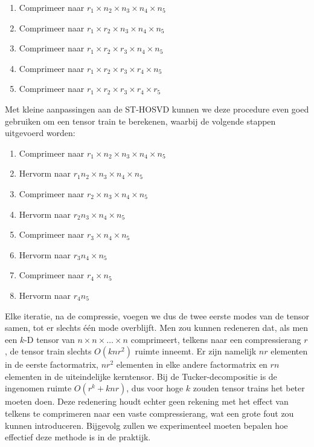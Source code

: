\begin{enumerate}
\item Comprimeer naar $r_1 \times n_2 \times n_3 \times n_4 \times n_5$
\item Comprimeer naar $r_1 \times r_2 \times n_3 \times n_4 \times n_5$
\item Comprimeer naar $r_1 \times r_2 \times r_3 \times n_4 \times n_5$
\item Comprimeer naar $r_1 \times r_2 \times r_3 \times r_4 \times n_5$
\item Comprimeer naar $r_1 \times r_2 \times r_3 \times r_4 \times r_5$
\end{enumerate}

Met kleine aanpassingen aan de ST-HOSVD kunnen we deze procedure even goed gebruiken om een tensor train te berekenen, waarbij de volgende stappen uitgevoerd worden:

\begin{enumerate}
\item Comprimeer naar $r_1 \times n_2 \times n_3 \times n_4 \times n_5$
\item Hervorm naar $r_1 n_2 \times n_3 \times n_4 \times n_5$
\item Comprimeer naar $r_2 \times n_3 \times n_4 \times n_5$
\item Hervorm naar $r_2 n_3 \times n_4 \times n_5$
\item Comprimeer naar $r_3 \times n_4 \times n_5$
\item Hervorm naar $r_3 n_4 \times n_5$
\item Comprimeer naar $r_4 \times n_5$
\item Hervorm naar $r_4 n_5$
\end{enumerate}

Elke iteratie, na de compressie, voegen we dus de twee eerste modes van de tensor samen, tot er slechts \'e\'en mode overblijft. Men zou kunnen redeneren dat, als men een $k$-D tensor van $n \times n \times \dots \times n$ comprimeert, telkens naar een compressierang $r$, de tensor train slechts $O(knr^2)$ ruimte inneemt. Er zijn namelijk $nr$ elementen in de eerste factormatrix, $nr^2$ elementen in elke andere factormatrix en $rn$ elementen in de uiteindelijke kerntensor. Bij de Tucker-decompositie is de ingenomen ruimte $O(r^k + knr)$, dus voor hoge $k$ zouden tensor trains het beter moeten doen. Deze redenering houdt echter geen rekening met het effect van telkens te comprimeren naar een vaste compressierang, wat een grote fout zou kunnen introduceren. Bijgevolg zullen we experimenteel moeten bepalen hoe effectief deze methode is in de praktijk.

